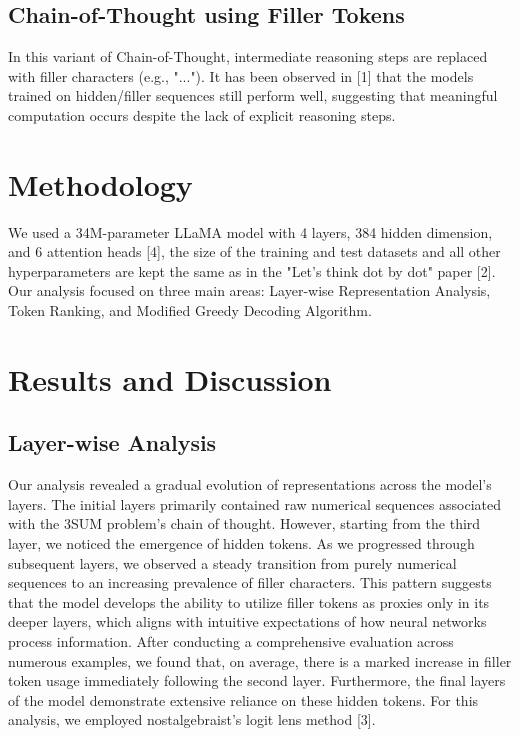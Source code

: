 \documentclass[10pt,a4paper]{article}
\begin{document}
\subsection{Chain-of-Thought using Filler Tokens}
In this variant of Chain-of-Thought, intermediate reasoning steps are replaced with filler characters (e.g., "..."). It has been observed in [1] that the models trained on hidden/filler sequences still perform well, suggesting that meaningful computation occurs despite the lack of explicit reasoning steps.

\section{Methodology}
We used a 34M-parameter LLaMA model with 4 layers, 384 hidden dimension, and 6 attention heads [4], the size of the training and test datasets and all other hyperparameters are kept the same as in the "Let's think dot by dot" paper [2]. Our analysis focused on three main areas: Layer-wise Representation Analysis, Token Ranking, and Modified Greedy Decoding Algorithm.

\section{Results and Discussion}

\subsection{Layer-wise Analysis}
Our analysis revealed a gradual evolution of representations across the model's layers. The initial layers primarily contained raw numerical sequences associated with the 3SUM problem's chain of thought. However, starting from the third layer, we noticed the emergence of hidden tokens. As we progressed through subsequent layers, we observed a steady transition from purely numerical sequences to an increasing prevalence of filler characters.
This pattern suggests that the model develops the ability to utilize filler tokens as proxies only in its deeper layers, which aligns with intuitive expectations of how neural networks process information. After conducting a comprehensive evaluation across numerous examples, we found that, on average, there is a marked increase in filler token usage immediately following the second layer. Furthermore, the final layers of the model demonstrate extensive reliance on these hidden tokens.
For this analysis, we employed nostalgebraist's logit lens method [3].
\end{document}
